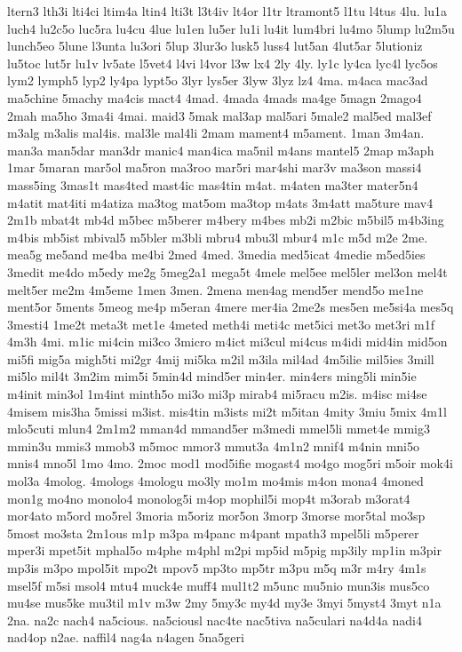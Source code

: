 {ltern3
lth3i
lti4ci
ltim4a
ltin4
lti3t
l3t4iv
lt4or
l1tr
ltramont5
l1tu
l4tus
4lu.
lu1a
luch4
lu2c5o
luc5ra
lu4cu
4lue
lu1en
lu5er
lu1i
lu4it
lum4bri
lu4mo
5lump
lu2m5u
lunch5eo
5lune
l3unta
lu3ori
5lup
3lur3o
lusk5
luss4
lut5an
4lut5ar
5lutioniz
lu5toc
lut5r
lu1v
lv5ate
l5vet4
l4vi
l4vor
l3w
lx4
2ly
4ly.
ly1c
ly4ca
lyc4l
lyc5os
lym2
lymph5
lyp2
ly4pa
lypt5o
3lyr
lys5er
3lyw
3lyz
lz4
4ma.
m4aca
mac3ad
ma5chine
5machy
ma4cis
mact4
4mad.
4mada
4mads
ma4ge
5magn
2mago4
2mah
ma5ho
3ma4i
4mai.
maid3
5mak
mal3ap
mal5ari
5male2
mal5ed
mal3ef
m3alg
m3alis
mal4is.
mal3le
mal4li
2mam
mament4
m5ament.
1man
3m4an.
man3a
man5dar
man3dr
manic4
man4ica
ma5nil
m4ans
mantel5
2map
m3aph
1mar
5maran
mar5ol
ma5ron
ma3roo
mar5ri
mar4shi
mar3v
ma3son
massi4
mass5ing
3mas1t
mas4ted
mast4ic
mas4tin
m4at.
m4aten
ma3ter
mater5n4
m4atit
mat4iti
m4atiza
ma3tog
mat5om
ma3top
m4ats
3m4att
ma5ture
mav4
2m1b
mbat4t
mb4d
m5bec
m5berer
m4bery
m4bes
mb2i
m2bic
m5bil5
m4b3ing
m4bis
mb5ist
mbival5
m5bler
m3bli
mbru4
mbu3l
mbur4
m1c
m5d
m2e
2me.
mea5g
me5and
me4ba
me4bi
2med
4med.
3media
med5icat
4medie
m5ed5ies
3medit
me4do
m5edy
me2g
5meg2a1
mega5t
4mele
mel5ee
mel5ler
mel3on
mel4t
melt5er
me2m
4m5eme
1men
3men.
2mena
men4ag
mend5er
mend5o
me1ne
ment5or
5ments
5meog
me4p
m5eran
4mere
mer4ia
2me2s
mes5en
me5si4a
mes5q
3mesti4
1me2t
meta3t
met1e
4meted
meth4i
meti4c
met5ici
met3o
met3ri
m1f
4m3h
4mi.
m1ic
mi4cin
mi3co
3micro
m4ict
mi3cul
mi4cus
m4idi
mid4in
mid5on
mi5fi
mig5a
migh5ti
mi2gr
4mij
mi5ka
m2il
m3ila
mil4ad
4m5ilie
mil5ies
3mill
mi5lo
mil4t
3m2im
mim5i
5min4d
mind5er
min4er.
min4ers
ming5li
min5ie
m4init
min3ol
1m4int
minth5o
mi3o
mi3p
mirab4
mi5racu
m2is.
m4isc
mi4se
4misem
mis3ha
5missi
m3ist.
mis4tin
m3ists
mi2t
m5itan
4mity
3miu
5mix
4m1l
mlo5cuti
mlun4
2m1m2
mman4d
mmand5er
m3medi
mmel5li
mmet4e
mmig3
mmin3u
mmis3
mmob3
m5moc
mmor3
mmut3a
4m1n2
mnif4
m4nin
mni5o
mnis4
mno5l
1mo
4mo.
2moc
mod1
mod5ifie
mogast4
mo4go
mog5ri
m5oir
mok4i
mol3a
4molog.
4mologs
4mologu
mo3ly
mo1m
mo4mis
m4on
mona4
4moned
mon1g
mo4no
monolo4
monolog5i
m4op
mophil5i
mop4t
m3orab
m3orat4
mor4ato
m5ord
mo5rel
3moria
m5oriz
mor5on
3morp
3morse
mor5tal
mo3sp
5most
mo3sta
2m1ous
m1p
m3pa
m4panc
m4pant
mpath3
mpel5li
m5perer
mper3i
mpet5it
mphal5o
m4phe
m4phl
m2pi
mp5id
m5pig
mp3ily
mp1in
m3pir
mp3is
m3po
mpol5it
mpo2t
mpov5
mp3to
mp5tr
m3pu
m5q
m3r
m4ry
4m1s
msel5f
m5si
msol4
mtu4
muck4e
muff4
mul1t2
m5unc
mu5nio
mun3is
mus5co
mu4se
mus5ke
mu3til
m1v
m3w
2my
5my3c
my4d
my3e
3myi
5myst4
3myt
n1a
2na.
na2c
nach4
na5cious.
na5ciousl
nac4te
nac5tiva
na5culari
na4d4a
nadi4
nad4op
n2ae.
naffil4
nag4a
n4agen
5na5geri
}
